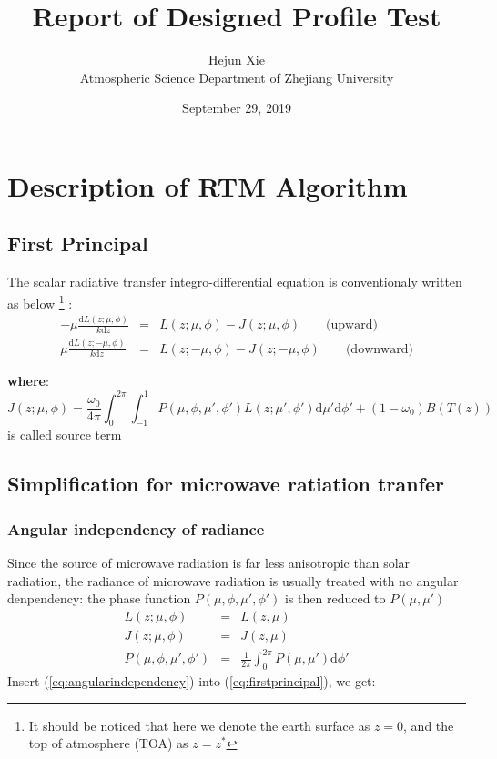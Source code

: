 \documentclass[a4paper]{report}
\begin{document}
\newcommand{\ud}{\mathrm{d}}
\newcommand{\oops}[1]{\textbf{#1}}

\title{Report of Designed Profile Test}
\author{Hejun Xie\\
Atmospheric Science Department of Zhejiang University}
\date{September 29, 2019}
\maketitle

\newpage
\chapter{Description of RTM Algorithm}

\section{First Principal}
The scalar radiative transfer integro-differential equation is conventionaly
written as below
\footnote{It should be noticed that here we denote the earth surface as $z = 0$, 
and the top of atmosphere (TOA) as $z = z^{*}$}
:  
\begin{eqnarray} \label{eq:firstprincipal}
-\mu \frac{\ud L(z; \mu, \phi)}{k \ud z} & = & 
L(z; \mu, \phi) - J(z; \mu, \phi) \qquad \textrm{(upward)} \nonumber\\
\mu \frac{\ud L(z; -\mu, \phi)}{k \ud z} & = & 
L(z; -\mu, \phi) - J(z; -\mu, \phi) \qquad \textrm{(downward)}
\end{eqnarray}

\oops{where}:
\begin{equation} \label{eq:sourceterm1}
    J(z; \mu, \phi) = 
    \frac{\omega_{0}}{4\pi}\int_{0}^{2\pi}\!\!\!\int_{-1}^{1}
    P(\mu, \phi, \mu', \phi')L(z;\mu',\phi')\ud\mu'\ud\phi'
    + (1-\omega_{0})B(T(z))
\end{equation}
is called source term

\section{Simplification for microwave ratiation tranfer}
\subsection{Angular independency of radiance}
Since the source of microwave radiation is far less anisotropic than solar radiation,
the radiance of microwave radiation is usually treated with no angular denpendency:
the phase function $P(\mu,\phi,\mu',\phi')$ is then reduced to $P(\mu,\mu')$
\begin{eqnarray} \label{eq:angularindependency}
    L(z;\mu,\phi) & = & L(z,\mu) \nonumber\\
    J(z;\mu,\phi) & = & J(z,\mu) \nonumber\\
    P(\mu,\phi,\mu',\phi') & = & \frac{1}{2\pi}\int_{0}^{2\pi}P(\mu,\mu')\ud\phi'
\end{eqnarray}
Insert (\ref{eq:angularindependency}) into (\ref{eq:firstprincipal}), we get:
\end{document}
